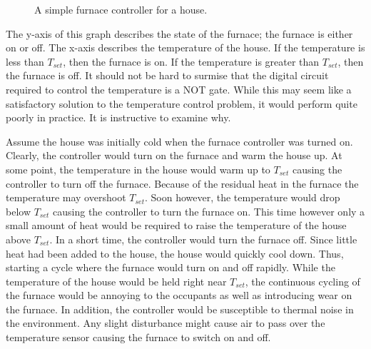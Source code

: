 \begin{figure}[ht]
\caption{A simple furnace controller for a house.}
\label{fig:SimpleFurnace}
\end{figure}

The y-axis of this graph describes the state of the furnace; 
the furnace is either on or off.  The x-axis describes the 
temperature of the house.  
If the temperature is less than $T_{set}$, then the furnace is on.  
If the temperature is greater than $T_{set}$, then the furnace is off.  
It should not be hard to surmise that the digital circuit required to
control the temperature is a NOT gate.  While this may seem like a
satisfactory solution to the temperature control problem, it would
perform quite poorly in practice.  It is instructive to examine why.

Assume the house was initially cold when the
furnace controller was turned on.  Clearly, the controller would turn on the furnace
and warm the house up. At some point, the temperature in the house would
warm up to $T_{set}$ causing the controller to turn off the furnace.  
Because of the residual heat in the furnace the temperature may overshoot 
$T_{set}$.  Soon however, the temperature would drop below $T_{set}$ causing
the controller to turn the furnace on.  This time however only a small amount
of heat would be required to raise the temperature of the house
above $T_{set}$.  In a short time, the controller would turn the furnace off.
Since little heat had been added to the house, the house would quickly cool 
down.  Thus, starting a cycle where the furnace would turn on and off
rapidly. While the temperature of the house would be held right near 
$T_{set}$, the continuous cycling of the furnace would be annoying to 
the occupants as well as introducing wear on the furnace.  In addition, the 
controller would be susceptible to thermal noise in the environment.  Any
slight disturbance might cause air to pass over the temperature
sensor causing the furnace to switch on and off.

